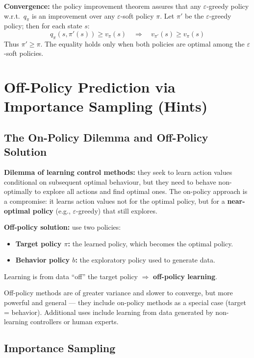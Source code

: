 \documentclass[11pt,a4paper]{article}
\theoremstyle{definition}
\theoremstyle{plain}
\theoremstyle{remark}
\begin{document}
\textbf{Convergence:} the policy improvement theorem assures that any $\varepsilon$-greedy policy w.r.t.\ $q_\pi$ is an improvement over any $\varepsilon$-soft policy $\pi$. Let $\pi'$ be the $\varepsilon$-greedy policy; then for each state $s$:
\[
    q_\pi(s, \pi'(s)) \geq v_\pi(s) \quad \Rightarrow \quad v_{\pi'}(s) \geq v_\pi(s)
\]
Thus $\pi' \geq \pi$. The equality holds only when both policies are optimal among the $\varepsilon$-soft policies.

\section{Off-Policy Prediction via Importance Sampling (Hints)}

\subsection{The On-Policy Dilemma and Off-Policy Solution}

\textbf{Dilemma of learning control methods:} they seek to learn action values conditional on subsequent optimal behaviour, but they need to behave non-optimally to explore all actions and find optimal ones. The on-policy approach is a compromise: it learns action values not for the optimal policy, but for a \textbf{near-optimal policy} (e.g., $\varepsilon$-greedy) that still explores.

\textbf{Off-policy solution:} use two policies:
\begin{itemize}
    \item \textbf{Target policy $\pi$:} the learned policy, which becomes the optimal policy.
    \item \textbf{Behavior policy $b$:} the exploratory policy used to generate data.
\end{itemize}
Learning is from data ``off'' the target policy $\Rightarrow$ \textbf{off-policy learning}.

Off-policy methods are of greater variance and slower to converge, but more powerful and general — they include on-policy methods as a special case (target = behavior). Additional uses include learning from data generated by non-learning controllers or human experts.

\subsection{Importance Sampling}
\end{document}
